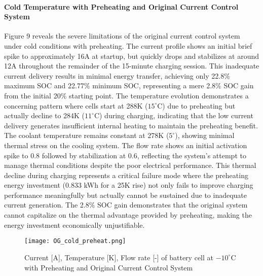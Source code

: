 \documentclass[conference]{IEEEtran}
\begin{document}
\paragraph {\textbf{Cold Temperature with Preheating and Original Current Control System}}

Figure 9 reveals the severe limitations of the original current control system under cold conditions with preheating. The current profile shows an initial brief spike to approximately 16A at startup, but quickly drops and stabilizes at around 12A throughout the remainder of the 15-minute charging session. This inadequate current delivery results in minimal energy transfer, achieving only 22.8$\%$ maximum SOC and 22.77$\%$ minimum SOC, representing a mere 2.8$\%$ SOC gain from the initial 20$\%$ starting point.
The temperature evolution demonstrates a concerning pattern where cells start at 288K ($15^\circ$C) due to preheating but actually decline to 284K ($11^\circ$C) during charging, indicating that the low current delivery generates insufficient internal heating to maintain the preheating benefit. The coolant temperature remains constant at 278K ($5^\circ$), showing minimal thermal stress on the cooling system. The flow rate shows an initial activation spike to 0.8 followed by stabilization at 0.6, reflecting the system's attempt to manage thermal conditions despite the poor electrical performance.
This thermal decline during charging represents a critical failure mode where the preheating energy investment (0.833 kWh for a 25K rise) not only fails to improve charging performance meaningfully but actually cannot be sustained due to inadequate current generation. The 2.8$\%$ SOC gain demonstrates that the original system cannot capitalize on the thermal advantage provided by preheating, making the energy investment economically unjustifiable.

\begin{figure}[H]
    \centering
    \texttt{[image: OG\_cold\_preheat.png]}
    \caption{Current [A], Temperature [K], Flow rate [-] of battery cell at $-10^\circ$C with Preheating and Original Current Control System }
    \label{fig:enter-label}
\end{figure}
\end{document}
